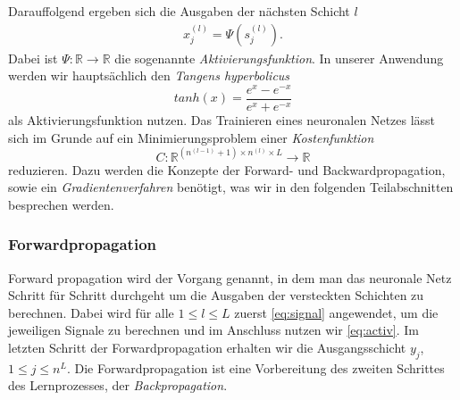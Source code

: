 Darauffolgend ergeben sich die Ausgaben der nächsten Schicht $l$
\begin{align}
    x_j^{(l)}=\Psi(s_j^{(l)}). \label{eq:activ}
\end{align}
Dabei ist $\Psi: \mathbb{R} \rightarrow \mathbb{R}$ die sogenannte \textit{Aktivierungsfunktion}. In unserer Anwendung werden wir
hauptsächlich den \textit{Tangens hyperbolicus}
\[
    tanh(x)=\frac{e^x - e^{-x}}{e^x + e^{-x}}
\]
als Aktivierungsfunktion nutzen. Das Trainieren eines neuronalen Netzes lässt sich im Grunde auf ein Minimierungsproblem
einer \textit{Kostenfunktion}
\[
    C: \mathbb{R}^{\left(n^{(l-1)} + 1\right) \times n^{(l)} \times L} \rightarrow \mathbb{R}
\]
reduzieren. Dazu werden die Konzepte der Forward- und Backwardpropagation, sowie ein \textit{Gradientenverfahren}
benötigt, was wir in den folgenden Teilabschnitten besprechen werden.

\subsubsection{Forwardpropagation}
Forward propagation wird der Vorgang genannt, in dem man das neuronale Netz Schritt für Schritt durchgeht um die
Ausgaben der versteckten Schichten zu berechnen. Dabei wird für alle $1 \leq l \leq L$ zuerst \eqref{eq:signal}
angewendet, um die jeweiligen Signale zu berechnen und im Anschluss nutzen wir \eqref{eq:activ}. Im letzten
Schritt der Forwardpropagation erhalten wir die Ausgangsschicht $y_{j}$, $1\leq j \leq n^{L}$. Die Forwardpropagation
ist eine Vorbereitung des zweiten Schrittes des Lernprozesses, der \textit{Backpropagation}.

